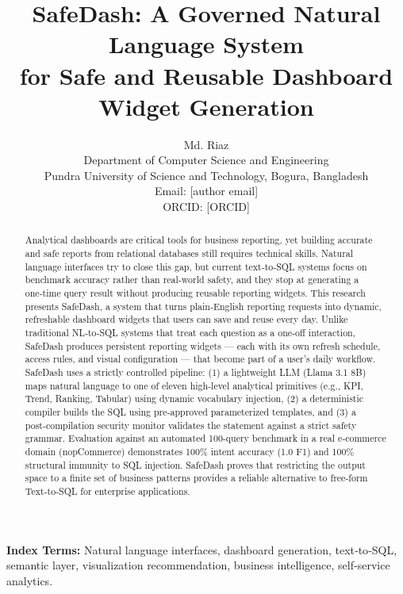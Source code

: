 \documentclass[11pt]{article}
\title{SafeDash: A Governed Natural Language System\\
for Safe and Reusable Dashboard Widget Generation}
\author{Md. Riaz\\
Department of Computer Science and Engineering\\
Pundra University of Science and Technology, Bogura, Bangladesh\\
Email: [author email]\\
ORCID: [ORCID]}
\date{}
\begin{document}
\maketitle

\begin{abstract}
Analytical dashboards are critical tools for business reporting, yet building accurate and safe reports from relational databases still requires technical skills. Natural language interfaces try to close this gap, but current text‑to‑SQL systems focus on benchmark accuracy rather than real‑world safety, and they stop at generating a one‑time query result without producing reusable reporting widgets. This research presents SafeDash, a system that turns plain‑English reporting requests into dynamic, refreshable dashboard widgets that users can save and reuse every day. Unlike traditional NL‑to‑SQL systems that treat each question as a one‑off interaction, SafeDash produces persistent reporting widgets --- each with its own refresh schedule, access rules, and visual configuration --- that become part of a user's daily workflow. SafeDash uses a strictly controlled pipeline: (1) a lightweight LLM (Llama 3.1 8B) maps natural language to one of eleven high‑level analytical primitives (e.g., KPI, Trend, Ranking, Tabular) using dynamic vocabulary injection, (2) a deterministic compiler builds the SQL using pre‑approved parameterized templates, and (3) a post‑compilation security monitor validates the statement against a strict safety grammar. Evaluation against an automated 100-query benchmark in a real e‑commerce domain (nopCommerce) demonstrates 100\% intent accuracy (1.0 F1) and 100\% structural immunity to SQL injection. SafeDash proves that restricting the output space to a finite set of business patterns provides a reliable alternative to free‑form Text‑to‑SQL for enterprise applications.
\end{abstract}

\noindent\textbf{Index Terms:} Natural language interfaces, dashboard generation, text‑to‑SQL, semantic layer, visualization recommendation, business intelligence, self‑service analytics.
\end{document}
